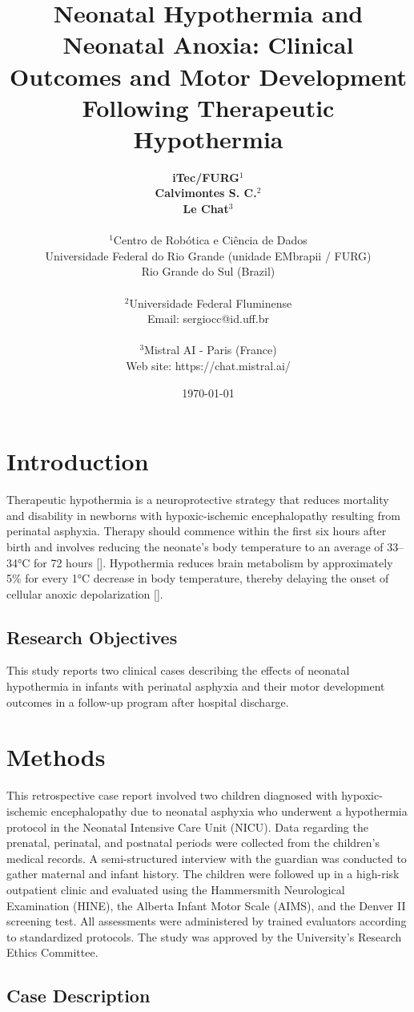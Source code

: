 \documentclass[11pt,a4paper]{article}
\title{\textbf{Neonatal Hypothermia and Neonatal Anoxia: Clinical Outcomes and Motor Development Following Therapeutic Hypothermia}}
\author{
	\textbf{iTec/FURG}$^{1}$ \\
	\textbf{Calvimontes S. C.}$^{2}$ \\
	\textbf{Le Chat}$^{3}$ \\
	\\
	\small $^{1}$Centro de Robótica e Ciência de Dados \\
	\small Universidade Federal do Rio Grande (unidade EMbrapii / FURG) \\
	\small Rio Grande do Sul (Brazil) \\
	\\
	\small $^{2}$Universidade Federal Fluminense \\
	\small Email: sergiocc@id.uff.br \\
	\\
	\small $^{3}$Mistral AI - Paris (France) \\
	\small Web site: https://chat.mistral.ai/
}
\date{\today}
\begin{document}
	
	\maketitle
	
	\newpage
	
	\section{Introduction}
	Therapeutic hypothermia is a neuroprotective strategy that reduces mortality and disability in newborns with hypoxic-ischemic encephalopathy resulting from perinatal asphyxia. Therapy should commence within the first six hours after birth and involves reducing the neonate’s body temperature to an average of 33–34°C for 72 hours [\cite{Azzopardi2014,Thayyil2021,Abate2021}]. Hypothermia reduces brain metabolism by approximately 5\% for every 1°C decrease in body temperature, thereby delaying the onset of cellular anoxic depolarization [\cite{Silveira2015}].
		
	\subsection{Research Objectives}
	This study reports two clinical cases describing the effects of neonatal hypothermia in infants with perinatal asphyxia and their motor development outcomes in a follow-up program after hospital discharge.
	
	\section{Methods}
	This retrospective case report involved two children diagnosed with hypoxic-ischemic encephalopathy due to neonatal asphyxia who underwent a hypothermia protocol in the Neonatal Intensive Care Unit (NICU). Data regarding the prenatal, perinatal, and postnatal periods were collected from the children’s medical records. A semi-structured interview with the guardian was conducted to gather maternal and infant history. The children were followed up in a high-risk outpatient clinic and evaluated using the Hammersmith Neurological Examination (HINE), the Alberta Infant Motor Scale (AIMS), and the Denver II screening test. All assessments were administered by trained evaluators according to standardized protocols. The study was approved by the University’s Research Ethics Committee.
	
	\subsection{Case Description}
\end{document}
